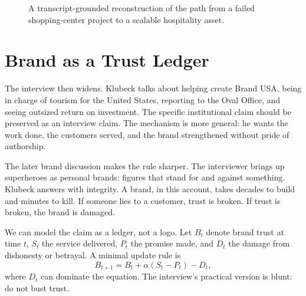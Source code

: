 \begin{figure}
\centering
{}
\caption{A transcript-grounded reconstruction of the path from a failed shopping-center project to a scalable hospitality asset.}
\end{figure}

\section{Brand as a Trust Ledger}

The interview then widens. Klubeck talks about helping create Brand USA, being in charge of tourism for the United States, reporting to the Oval Office, and seeing outsized return on investment. The specific institutional claim should be preserved as an interview claim. The mechanism is more general: he wants the work done, the customers served, and the brand strengthened without pride of authorship.

The later brand discussion makes the rule sharper. The interviewer brings up superheroes as personal brands: figures that stand for and against something. Klubeck answers with integrity. A brand, in this account, takes decades to build and minutes to kill. If someone lies to a customer, trust is broken. If trust is broken, the brand is damaged.

We can model the claim as a ledger, not a logo. Let \(B_t\) denote brand trust at time \(t\), \(S_t\) the service delivered, \(P_t\) the promise made, and \(D_t\) the damage from dishonesty or betrayal. A minimal update rule is
\begin{equation}
B_{t+1}=B_t+\alpha(S_t-P_t)-D_t,
\end{equation}
where \(D_t\) can dominate the equation. The interview's practical version is blunt: do not bust trust.


